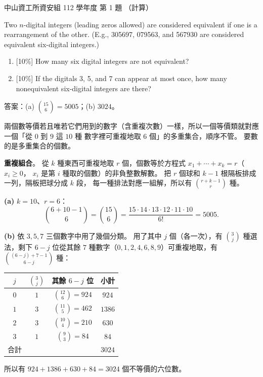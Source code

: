 \begin{pastexam}[label={px:nsysu-112-dmalg-01}]{中山資工所資安組 112 學年度 第 1 題}
（計算）

Two $n$-digital integers (leading zeros allowed) are considered equivalent if one is a rearrangement of
the other. (E.g., 305697, 079563, and 567930 are considered equivalent six-digital integers.)
\begin{enumerate}[label=(\alph*)]
\item {[10\%]} How many six digital integers are not equivalent?
\item {[10\%]} If the digitals 3, 5, and 7 can appear at most once, how many nonequivalent six-digital
integers are there?
\end{enumerate}
\end{pastexam}

\begin{pastsoln}
答案：(a) $\binom{15}{6} = 5005$；(b) $3024$。

兩個數等價若且唯若它們用到的數字（含重複次數）一樣，所以一個等價類就對應一個「從 $0$ 到 $9$ 這 $10$ 種
數字裡可重複地取 $6$ 個」的多重集合，順序不管。 要數的是多重集合的個數。

\textbf{重複組合}。 從 $k$ 種東西可重複地取 $r$ 個，個數等於方程式 $x_1 + \cdots + x_k = r$（$x_i \ge 0$，
$x_i$ 是第 $i$ 種取的個數）的非負整數解數。 把 $r$ 個球和 $k - 1$ 根隔板排成一列，隔板把球分成 $k$ 段，
每一種排法對應一組解，所以有 $\binom{r + k - 1}{r}$ 種。

\textbf{(a)} $k = 10$、$r = 6$：
\[
\binom{6 + 10 - 1}{6} = \binom{15}{6} = \frac{15 \cdot 14 \cdot 13 \cdot 12 \cdot 11 \cdot 10}{6!} = 5005.
\]

\textbf{(b)} 依 $3, 5, 7$ 三個數字中用了幾個分類。 用了其中 $j$ 個（各一次），有 $\binom{3}{j}$ 種選法，剩下
$6 - j$ 位從其餘 $7$ 種數字（$0, 1, 2, 4, 6, 8, 9$）可重複地取，有 $\binom{(6-j) + 7 - 1}{6-j}$ 種：
\begin{center}
\begin{tabular}{cccc}
\toprule
$j$ & $\binom{3}{j}$ & 其餘 $6 - j$ 位 & 小計 \\
\midrule
$0$ & $1$ & $\binom{12}{6} = 924$ & $924$ \\
$1$ & $3$ & $\binom{11}{5} = 462$ & $1386$ \\
$2$ & $3$ & $\binom{10}{4} = 210$ & $630$ \\
$3$ & $1$ & $\binom{9}{3} = 84$ & $84$ \\
\midrule
合計 & & & $3024$ \\
\bottomrule
\end{tabular}
\end{center}
所以有 $924 + 1386 + 630 + 84 = 3024$ 個不等價的六位數。
\end{pastsoln}
